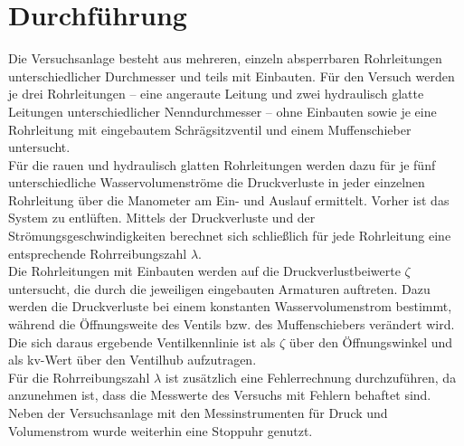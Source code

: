 \section{Durchführung}
\label{sec:durchfuerung}

Die Versuchsanlage besteht aus mehreren, einzeln absperrbaren Rohrleitungen unterschiedlicher Durchmesser und teils mit Einbauten. Für den Versuch werden je drei Rohrleitungen – eine angeraute Leitung und zwei hydraulisch glatte Leitungen unterschiedlicher Nenndurchmesser – ohne Einbauten sowie je eine Rohrleitung mit eingebautem Schrägsitzventil und einem Muffenschieber untersucht. \\
Für die rauen und hydraulisch glatten Rohrleitungen werden dazu für je fünf unterschiedliche Wasservolumenströme die Druckverluste in jeder einzelnen Rohrleitung über die Manometer am Ein- und Auslauf ermittelt. \linebreak 
Vorher ist das System zu entlüften. Mittels der Druckverluste und der Strömungsgeschwindigkeiten berechnet sich schließlich für jede Rohrleitung eine entsprechende Rohrreibungszahl $\lambda$. \\
Die Rohrleitungen mit Einbauten werden auf die Druckverlustbeiwerte $\zeta$ untersucht, die durch die jeweiligen eingebauten Armaturen auftreten. Dazu werden die Druckverluste bei einem konstanten Wasservolumenstrom bestimmt, während die Öffnungsweite des Ventils bzw. des Muffenschiebers verändert wird. Die sich daraus ergebende Ventilkennlinie ist als $\zeta$ über den Öffnungswinkel und als kv-Wert über den Ventilhub aufzutragen. \\
Für die Rohrreibungszahl $\lambda$ ist zusätzlich eine Fehlerrechnung durchzuführen, da anzunehmen ist, dass die Messwerte des Versuchs mit Fehlern behaftet sind.\\
Neben der Versuchsanlage mit den Messinstrumenten für Druck und Volumenstrom wurde weiterhin eine Stoppuhr genutzt.